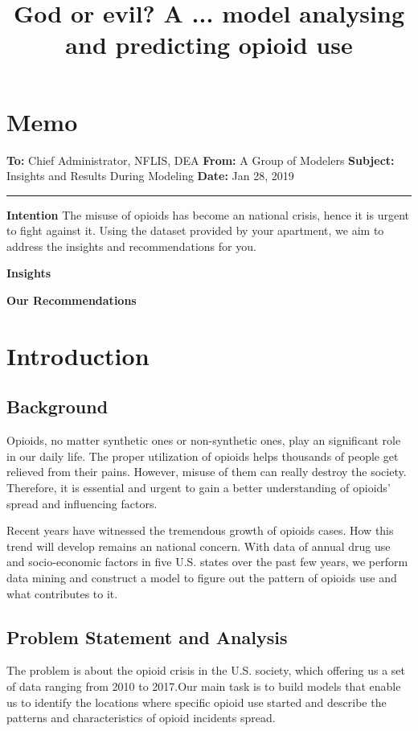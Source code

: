 \documentclass[12pt]{article}
\title{\large God or evil? A ... model analysing and predicting opioid use}  %
\begin{document}

\section*{Memo}
\textbf{To:} Chief Administrator, NFLIS, DEA \newline
\textbf{From:} A Group of Modelers \newline
\textbf{Subject:} Insights and Results During Modeling\newline
\textbf{Date:} Jan 28, 2019\newline
\noindent\rule{\textwidth}{0.8pt}
\indent \textbf{Intention}\newline
The misuse of opioids has become an national crisis, hence it is urgent to fight against it. Using the dataset provided by your apartment, we aim to address the insights and recommendations for you.

\indent \textbf{Insights}\newline

\indent \textbf{Our Recommendations}\newline
\newpage

\section{Introduction}
\subsection{Background}
Opioids, no matter synthetic ones or non-synthetic ones, play an significant role in our daily life. The proper utilization of opioids helps thousands of people get relieved from their pains. However, misuse of them can really destroy the society. Therefore, it is essential and urgent to gain a better understanding of opioids' spread and influencing factors.

Recent years have witnessed the tremendous growth of opioids cases. How this trend will develop remains an national concern. With data of annual drug use and socio-economic factors in five U.S. states over the past few years, we perform data mining and construct a model to figure out the pattern of opioids use and what contributes to it.

\subsection{Problem Statement and Analysis}
The problem is about the opioid crisis in the U.S. society, which offering us a set of data ranging from 2010 to 2017.Our main task is to build models that enable us to identify the locations where specific opioid use started and describe the patterns and characteristics of opioid incidents spread. 
\end{document}
